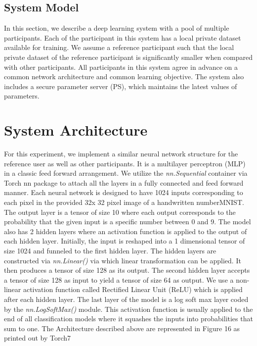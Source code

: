 \documentclass[conference]{IEEEtran}
\begin{document}
\subsection{System Model} \label{sec:systemModel}
In this section, we describe a deep learning system with a pool of multiple participants. Each of the participant in this system has a
local private dataset available for training. We assume a reference participant such that the local private dataset of the reference
participant is significantly smaller when compared with other participants. All participants in this system agree in advance on a
common network architecture and common learning objective. The system also includes a secure parameter server (PS), which maintains the
latest values of parameters. 

\section{System Architecture}
For this experiment, we implement a similar neural network structure for the reference user as well as other participants. It is a multilayer perceptron (MLP) in a classic feed forward arrangement. We utilize the \textit{nn.Sequential} container via Torch nn package to attach all the layers in a fully connected and feed forward manner.
Each neural network is designed to have 1024 inputs corresponding to each pixel in the provided 32x 32 pixel image of a handwritten number{MNIST}. The output layer is a tensor of size 10 where each output corresponds to the probability that the given input is a specific number between 0 and 9. The model also has 2 hidden layers where an activation function is applied to the output of each hidden layer.
Initially, the input is reshaped into a 1 dimensional tensor of size 1024 and funneled to the first hidden layer. The hidden layers are constructed via \textit{nn.Linear()} via which linear transformation can be applied. It then produces a tensor of size 128 as its output. The second hidden layer accepts a tensor of size 128 as input to yield a tensor of size 64 as output. We use a non-linear activation function called Rectified Linear Unit (ReLU) which is applied after each hidden layer. The last layer of the model is a log soft max layer coded by the \textit{nn.LogSoftMax()} module.  This activation function is usually applied to the end of all classification models where it squashes the inputs into probabilities that sum to one.
The Architecture described above are represented in Figure 16 as printed out by Torch7
   
\end{document}
